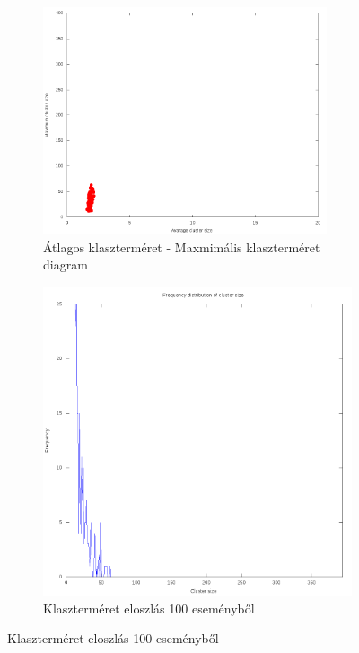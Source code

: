 \documentclass[a4paper,12pt]{article}
\begin{document}
\begin{figure}[H]
	\centering
	\begin{subfigure}{.49\textwidth}
		\includegraphics[width=0.92\textwidth]{mean-max8_80.png}
		\caption{ Átlagos klaszterméret - Maxmimális klaszterméret diagram }
	\end{subfigure}
	\begin{subfigure}{.49\textwidth}
		\includegraphics[width=.92\textwidth]{distribution_zoomed_8_80.png}
		\caption{ Klaszterméret eloszlás 100 eseményből } 
	\end{subfigure}
\end{figure}
\end{document}
